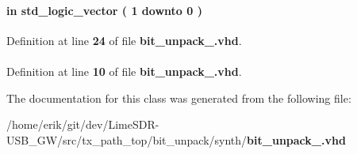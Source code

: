 \paragraph[{sample\+\_\+width}]{ {\bfseries \textcolor{keywordflow}{in}\textcolor{vhdlchar}{ }} {\bfseries \textcolor{comment}{std\+\_\+logic\+\_\+vector}\textcolor{vhdlchar}{ }\textcolor{vhdlchar}{(}\textcolor{vhdlchar}{ }\textcolor{vhdlchar}{ } \textcolor{vhdldigit}{1} \textcolor{vhdlchar}{ }\textcolor{keywordflow}{downto}\textcolor{vhdlchar}{ }\textcolor{vhdlchar}{ } \textcolor{vhdldigit}{0} \textcolor{vhdlchar}{ }\textcolor{vhdlchar}{)}\textcolor{vhdlchar}{ }} \hspace{0.3cm}{\ttfamily [Port]}}\label{classbit__unpack__64_aa4357f9a7d7e21fa49f9ce61eec07e23}


Definition at line {\bf 24} of file {\bf bit\+\_\+unpack\+\_.\+vhd}.

\paragraph[{std\+\_\+logic\+\_\+1164}]{\hspace{0.3cm}{\ttfamily [Package]}}\label{classbit__unpack__64_acd03516902501cd1c7296a98e22c6fcb}


Definition at line {\bf 10} of file {\bf bit\+\_\+unpack\+\_.\+vhd}.



The documentation for this class was generated from the following file\+:\begin{DoxyCompactItemize}
\item 
/home/erik/git/dev/\+Lime\+S\+D\+R-\/\+U\+S\+B\+\_\+\+G\+W/src/tx\+\_\+path\+\_\+top/bit\+\_\+unpack/synth/{\bf bit\+\_\+unpack\+\_.\+vhd}\end{DoxyCompactItemize}
